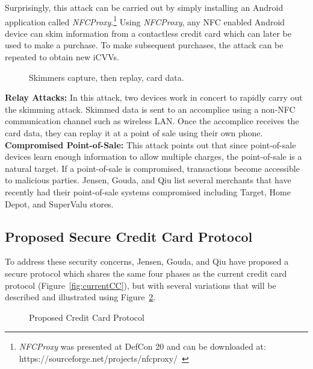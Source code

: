 \documentclass{sig-alternate}
\begin{document}
Surprisingly, this attack can be carried out by simply installing an Android application called \textit{NFCProxy}.\footnote{\textit{NFCProxy} was presented at DefCon 20 and can be downloaded at: https://sourceforge.net/projects/nfcproxy/~\cite{CC2016}}
Using \textit{NFCProxy}, any NFC enabled Android device can skim information from a contactless credit card which can later be used to make a purchase. To make subsequent purchases, the attack can be repeated to obtain new iCVVs.
\begin{figure}
\centering
{}
\caption{Skimmers capture, then replay, card data.~\cite{CC2016}}
\label{fig:skim}
\end{figure}
\vspace{2mm}\newline
\noindent\textbf{Relay Attacks:}
In this attack, two devices work in concert to rapidly carry out the skimming attack. Skimmed data is sent to an accomplice using a non-NFC communication channel such as wireless LAN. Once the accomplice receives the card data, they can replay it at a point of sale using their own phone.
\vspace{2mm}\newline
\noindent\textbf{Compromised Point-of-Sale:}
This attack points out that since point-of-sale devices learn enough information to allow multiple charges, the point-of-sale is a natural target. If a point-of-sale is compromised, transactions become accessible to malicious parties. Jensen, Gouda, and Qiu list several merchants that have recently had their point-of-sale systems compromised including Target, Home Depot, and SuperValu stores.

\subsection{Proposed Secure Credit Card Protocol}
To address these security concerns, Jensen, Gouda, and Qiu have proposed a secure protocol which shares the same four phases as the current credit card protocol (Figure~\ref{fig:currentCC}), but with several variations that will be described and illustrated using Figure~\ref{fig:secureCC}.

\begin{figure}
\centering
{}
\caption{Proposed Credit Card Protocol~\cite{CC2016}}
\label{fig:secureCC}
\end{figure}
\end{document}
